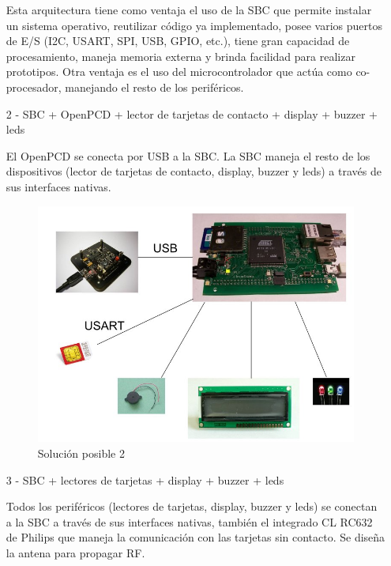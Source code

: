 \begin{itemize}
Esta arquitectura tiene como ventaja el uso de la SBC que permite instalar un sistema operativo, reutilizar código ya implementado, posee varios puertos de E/S (I2C, USART, SPI, USB, GPIO, etc.), tiene gran capacidad de procesamiento, maneja memoria externa y brinda facilidad para realizar prototipos. Otra ventaja es el uso del microcontrolador que actúa como co-procesador, manejando el resto de los periféricos.

\item[2 -] SBC + OpenPCD + lector de tarjetas de contacto + display + buzzer + leds
\bigskip

El OpenPCD se conecta por USB a la SBC. La SBC maneja el resto de los dispositivos (lector de tarjetas de contacto, display, buzzer y leds) a través de sus interfaces nativas.

\begin{figure}[H]
\centering
  \begin{center}
  \includegraphics[scale=.25]{Imagenes/2.jpg} 
  \end{center}
  \caption{Solución posible 2}\label{Fig:HW} 
\end{figure}

\newpage

\item[3 -] SBC + lectores de tarjetas + display + buzzer + leds
\bigskip

Todos los periféricos (lectores de tarjetas, display, buzzer y leds) se conectan a la SBC a través de sus interfaces nativas, también el integrado CL RC632 de Philips que maneja la comunicación con las tarjetas sin contacto. Se diseña la antena para propagar RF.


\end{itemize}
